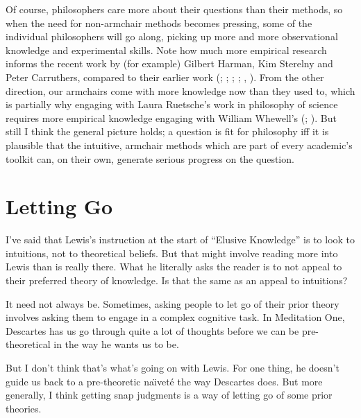 \documentclass[
  10pt,
  letterpaper,
  DIV=11,
  numbers=noendperiod,
  twoside]{scrartcl}
\begin{document}
Of course, philosophers care more about their questions than their
methods, so when the need for non-armchair methods becomes pressing,
some of the individual philosophers will go along, picking up more and
more observational knowledge and experimental skills. Note how much more
empirical research informs the recent work by (for example) Gilbert
Harman, Kim Sterelny and Peter Carruthers, compared to their earlier
work (;
;
;
;
,
). From the other direction, our
armchairs come with more knowledge now than they used to, which is
partially why engaging with Laura Ruetsche's work in philosophy of
science requires more empirical knowledge engaging with William
Whewell's (;
). But still I think the general
picture holds; a question is fit for philosophy iff it is plausible that
the intuitive, armchair methods which are part of every academic's
toolkit can, on their own, generate serious progress on the question.

\section{Letting Go}\label{sec-Go}

I've said that Lewis's instruction at the start of ``Elusive Knowledge''
is to look to intuitions, not to theoretical beliefs. But that might
involve reading more into Lewis than is really there. What he literally
asks the reader is to not appeal to their preferred theory of knowledge.
Is that the same as an appeal to intuitions?

It need not always be. Sometimes, asking people to let go of their prior
theory involves asking them to engage in a complex cognitive task. In
Meditation One, Descartes has us go through quite a lot of thoughts
before we can be pre-theoretical in the way he wants us to be.

But I don't think that's what's going on with Lewis. For one thing, he
doesn't guide us back to a pre-theoretic naı̈veté the way Descartes does.
But more generally, I think getting snap judgments is a way of letting
go of some prior theories.
\end{document}
